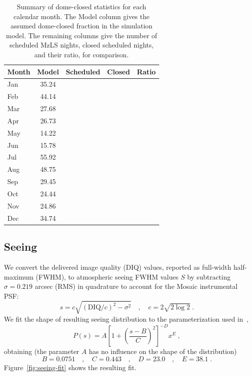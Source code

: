 \documentclass[12pt]{article}
\providecommand{\fig}[1]{Figure~\ref{fig:#1}}
\begin{document}
\begin{table}[htb]
\begin{center}
\begin{tabular}{lcccc}
    Month & Model & Scheduled & Closed & Ratio \\
    \hline
    Jan & 35.24 \\
    Feb & 44.14 \\
    Mar & 27.68 \\
    Apr & 26.73 \\
    May & 14.22 \\
    Jun & 15.78 \\
    Jul & 55.92 \\
    Aug & 48.75 \\
    Sep & 29.45 \\
    Oct & 24.44 \\
    Nov & 24.86 \\
    Dec & 34.74 \\
    \hline
\end{tabular}
\caption{Summary of dome-closed statistics for each calendar month.  The Model column gives the assumed dome-closed fraction in the simulation model.  The remaining columns give the number of scheduled MzLS nights, closed scheduled nights, and their ratio, for comparison.}
\label{tab:dome}
\end{center}
\end{table}

\subsection{Seeing}

We convert the delivered image quality (DIQ) values, reported as full-width half-maximum (FWHM), to atmospheric seeing FWHM values $S$ by subtracting $\sigma = 0.219$ arcsec (RMS) in quadrature to account for the Mosaic instrumental PSF:
$$
s = c \sqrt{(\text{DIQ} / c)^2 - \sigma^2} \quad , \quad c = 2 \sqrt{2\log 2} \; .
$$
We fit the shape of resulting seeing distribution to the parameterization used in~\cite{2014PASP..126..296D},
$$
P(s) = A \left[ 1 + \left(\frac{s-B}{C}\right)^2 \right]^{-D} x^E \;,
$$
obtaining (the parameter $A$ has no influence on the shape of the distribution)
$$
B = 0.0751 \quad,\quad C = 0.443 \quad,\quad D = 23.0 \quad,\quad E = 38.1 \; .
$$
\fig{seeing-fit} shows the resulting fit.
\end{document}

